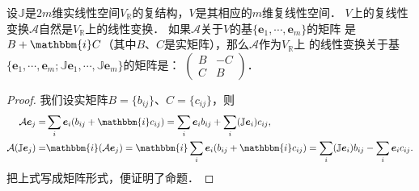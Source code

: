 \begin{proposition}\label{chcx:thm_ABC}
    设$\mathbb{J}$是$2m$维实线性空间$V_{\mathbb{R}}$的复结构，$V$是其相应的$m$维复线性空间．
    $V$上的复线性变换$\mathcal{A}$自然是$V_{\mathbb{R}}$上的线性变换．
    如果$\mathcal{A}$关于$V$的基$\{\boldsymbol{e}_1,\cdots,\boldsymbol{e}_m\}$的矩阵
    是$B+\mathbbm{i}C$（其中$B$、$C$是实矩阵），那么$\mathcal{A}$作为$V_{\mathbb{R}}$上
    的线性变换关于基$\{\boldsymbol{e}_1,\cdots,\boldsymbol{e}_m;
    \mathbb{J}\boldsymbol{e}_1,\cdots,\mathbb{J}\boldsymbol{e}_m\}$的矩阵是：
    $    \left(\begin{smallmatrix}
        B& -C \\ C & B
    \end{smallmatrix}\right)$．
\end{proposition}
\begin{proof}
    我们设实矩阵$B=\{b_{ij}\}$、$C=\{c_{ij}\}$，则
    \begin{align*}
        \mathcal{A} \boldsymbol{e}_{j} =& \sum_i \boldsymbol{e}_{i} (b_{ij}+\mathbbm{i}c_{ij}) 
        =\sum_i\boldsymbol{e}_{i} b_{ij} + \sum_i (\mathbb{J}\boldsymbol{e}_{i}) c_{ij} ,\\
        \mathcal{A} (\mathbb{J}\boldsymbol{e}_{j}) =& \mathbbm{i}( \mathcal{A} \boldsymbol{e}_{j})
        =\mathbbm{i} \sum_i \boldsymbol{e}_{i} (b_{ij}+\mathbbm{i}c_{ij}) 
        =\sum_i (\mathbb{J}\boldsymbol{e}_{i}) b_{ij} - \sum_i \boldsymbol{e}_{i} c_{ij} .
    \end{align*}
    把上式写成矩阵形式，便证明了命题．
\end{proof}


